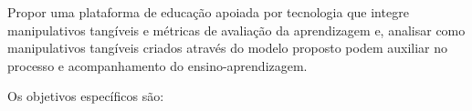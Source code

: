 
Propor uma plataforma de educação apoiada por tecnologia que integre manipulativos tangíveis e métricas de avaliação da aprendizagem e, analisar como manipulativos tangíveis criados através do modelo proposto podem auxiliar no processo e acompanhamento do ensino-aprendizagem.




Os objetivos específicos são:


